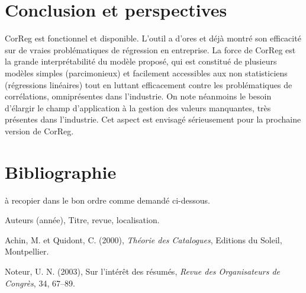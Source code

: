 \documentclass[12pt]{article}
\begin{document}
\section{Conclusion et perspectives}
	CorReg est fonctionnel et disponible. L'outil a d'ores et déjà montré son efficacité sur de vraies problématiques de régression en entreprise.
	La force de CorReg est la grande interprétabilité du modèle proposé, qui est constitué de plusieurs modèles simples (parcimonieux) et facilement accessibles aux non statisticiens (régressions linéaires) tout en luttant efficacement contre les problématiques de corrélations, omniprésentes dans l'industrie.
	On note néanmoins le besoin d'élargir le champ d'application à la gestion des valeurs manquantes, très présentes dans l'industrie. Cet aspect est envisagé sérieusement pour la prochaine version de CorReg.
	

\section*{Bibliographie}
{}

à recopier dans le bon ordre comme demandé ci-dessous.

\noindent [1] Auteurs (année), Titre, revue, localisation.

\noindent [2] Achin, M. et Quidont, C. (2000), {\it Théorie des
Catalogues}, Editions du Soleil, Montpellier.

\noindent [3] Noteur, U. N. (2003), Sur l'intér\^et des
résumés, {\it Revue des Organisateurs de Congrès}, 34, 67--89.
\end{document}
